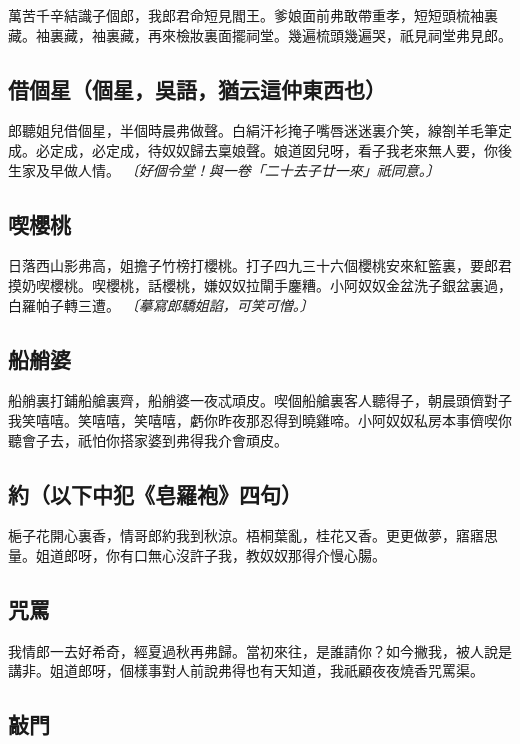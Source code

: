 萬苦千辛結識子個郎，我郎君命短見閻王。爹娘面前弗敢帶重孝，短短頭梳袖裏藏。袖裏藏，袖裏藏，再來檢妝裏面擺祠堂。幾遍梳頭幾遍哭，祇見祠堂弗見郎。

\subsection*{借個星（個星，吳語，猶云這仲東西也）}

郎聽姐兒借個星，半個時晨弗做聲。白絹汗衫掩子嘴唇迷迷裏介笑，線劄羊毛筆定成。必定成，必定成，待奴奴歸去稟娘聲。娘道囡兒呀，看子我老來無人要，你後生家及早做人情。
\textit{〔好個令堂！與一卷「二十去子廿一來」祇同意。〕}

\subsection*{喫櫻桃}

日落西山影弗高，姐擔子竹榜打櫻桃。打子四九三十六個櫻桃安來紅籃裏，要郎君摸奶喫櫻桃。喫櫻桃，話櫻桃，嫌奴奴拉閘手鏖糟。小阿奴奴金盆洗子銀盆裏過，白羅帕子轉三遭。
\textit{〔摹寫郎驕姐諂，可笑可憎。〕}

\subsection*{船艄婆}

船艄裏打鋪船艙裏齊，船艄婆一夜忒頑皮。喫個船艙裏客人聽得子，朝晨頭儕對子我笑嘻嘻。笑嘻嘻，笑嘻嘻，虧你昨夜那忍得到曉雞啼。小阿奴奴私房本事儕喫你聽會子去，祇怕你搭家婆到弗得我介會頑皮。

\subsection*{約（以下中犯《皂羅袍》四句）}

梔子花開心裏香，情哥郎約我到秋涼。梧桐葉亂，桂花又香。更更做夢，寤寤思量。姐道郎呀，你有口無心沒許子我，教奴奴那得介慢心腸。

\subsection*{咒罵}

我情郎一去好希奇，經夏過秋再弗歸。當初來往，是誰請你？如今撇我，被人說是講非。姐道郎呀，個樣事對人前說弗得也有天知道，我祇顧夜夜燒香咒罵渠。

\subsection*{敲門}

